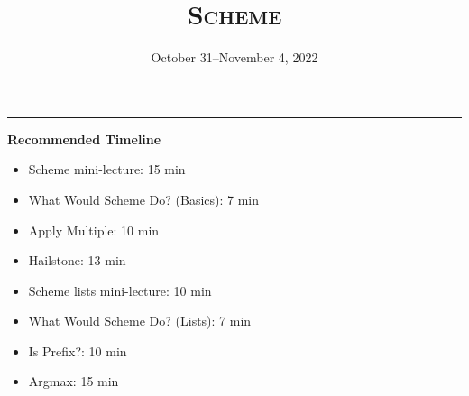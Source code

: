 \documentclass{exam}
\title{\textsc{Scheme}}
\date{October 31--November 4, 2022}
\begin{document}
\maketitle
\rule{\textwidth}{0.15em}
\fontsize{12}{15}\selectfont

\begin{meta}
\begin{blocksection}
\textbf{Recommended Timeline}
\begin{itemize}
    \item Scheme mini-lecture: 15 min
    \item What Would Scheme Do? (Basics): 7 min
    \item Apply Multiple: 10 min
    \item Hailstone: 13 min 
    \item Scheme lists mini-lecture: 10 min
    \item What Would Scheme Do? (Lists): 7 min
    \item Is Prefix?: 10 min
    \item Argmax: 15 min
\end{itemize}
\end{blocksection}
\end{meta}
\end{document}
